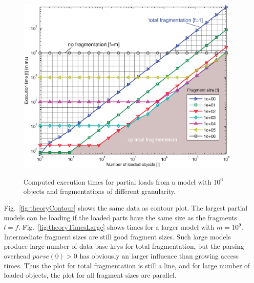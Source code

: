 \begin{figure}
\centering
\includegraphics[width=0.65\linewidth]{figures/theoryTimesSmall}
\label{fig:theoryTimesSmall}
\caption{Computed execution times for partial loads from a model with $10^6$ objects and fragmentations of different granularity.}
\end{figure}

Fig.~\ref{fig:theoryContour} shows the same data as contour plot. The largest partial models can be loading if the loaded parts have the same size as the fragments $l=f$. Fig.~\ref{fig:theoryTimesLarge} shows times for a larger model with $m=10^9$. Intermediate fragment sizes are still good fragment sizes. Such large models produce large number of data base keys for total fragmentation, but the parsing overhead $parse(0)>0$ has obviously an larger influence than growing access times. Thus the plot for total fragmentation is still a line, and for large number of loaded objects, the plot for all fragment sizes are parallel.

